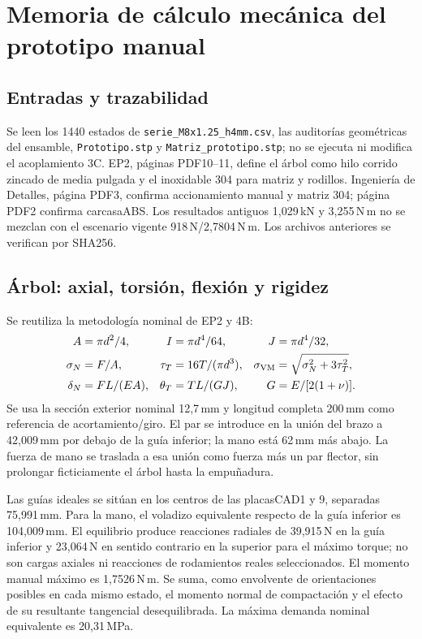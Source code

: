 \section{Memoria de cálculo mecánica del prototipo manual}
\subsection{Entradas y trazabilidad}
Se leen los 1440 estados de
\texttt{serie\_M8x1.25\_h4mm.csv}, las auditorías geométricas del ensamble,
\texttt{Prototipo.stp} y \texttt{Matriz\_prototipo.stp}; no se ejecuta ni
modifica el acoplamiento 3C. EP2, páginas PDF10--11, define el árbol como
hilo corrido zincado de media pulgada y el inoxidable 304 para matriz y
rodillos. Ingeniería de Detalles, página PDF3, confirma accionamiento
manual y matriz 304; página PDF2 confirma carcasaABS. Los resultados antiguos
1,029\,kN y 3,255\,N\,m no se mezclan con el escenario vigente 918\,N/2,7804\,N\,m.
Los archivos anteriores se verifican por SHA256.

\subsection{Árbol: axial, torsión, flexión y rigidez}
Se reutiliza la metodología nominal de EP2 y 4B:
\begin{align}
 A&=\pi d^2/4,& I&=\pi d^4/64,& J&=\pi d^4/32,\\
 \sigma_N&=F/A,&\tau_T&=16T/(\pi d^3),&
 \sigma_{\rm VM}&=\sqrt{\sigma_N^2+3\tau_T^2},\\
 \delta_N&=FL/(EA),& \theta_T&=TL/(GJ),&G&=E/[2(1+\nu)].
\end{align}
Se usa la sección exterior nominal 12,7\,mm y longitud completa 200\,mm como
referencia de acortamiento/giro. El par se introduce en la unión del brazo
a 42,009\,mm por debajo de la guía inferior; la mano está 62\,mm más abajo.
La fuerza de mano se traslada a esa unión como fuerza más un par flector,
sin prolongar ficticiamente el árbol hasta la empuñadura.

Las guías ideales se sitúan en los centros de las placasCAD1 y 9,
separadas 75,991\,mm. Para la mano, el voladizo equivalente respecto de la
guía inferior es 104,009\,mm. El equilibrio produce reacciones radiales de
39,915\,N en la guía inferior y 23,064\,N en sentido contrario en la superior
para el máximo torque; no son cargas axiales ni reacciones de rodamientos
reales seleccionados. El momento manual máximo es 1,7526\,N\,m.
Se suma, como envolvente de orientaciones posibles en cada mismo estado,
el momento normal de compactación y el efecto de su resultante tangencial
desequilibrada. La máxima demanda nominal equivalente es 20,31\,MPa.

